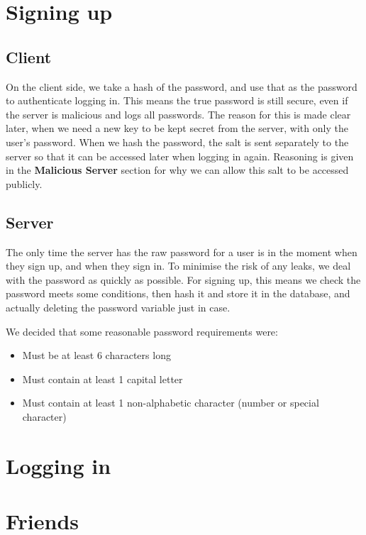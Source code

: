 \documentclass[12pt]{article}
\begin{document}

\section{Signing up}

\subsection{Client}

On the client side, we take a hash of the password, and use that as the password to authenticate logging in. This means the true password is still secure, even if the server is malicious and logs all passwords. The reason for this is made clear later, when we need a new key to be kept secret from the server, with only the user's password. When we hash the password, the salt is sent separately to the server so that it can be accessed later when logging in again. Reasoning is given in the \textbf{Malicious Server} section for why we can allow this salt to be accessed publicly.

\subsection{Server}

The only time the server has the raw password for a user is in the moment when they sign up, and when they sign in. To minimise the risk of any leaks, we deal with the password as quickly as possible. For signing up, this means we check the password meets some conditions, then hash it and store it in the database, and actually deleting the password variable just in case.

We decided that some reasonable password requirements were:

\begin{itemize}
    \item Must be at least 6 characters long
    \item Must contain at least 1 capital letter
    \item Must contain at least 1 non-alphabetic character (number or special character)
\end{itemize}

\section{Logging in}



\section{Friends}
\end{document}
